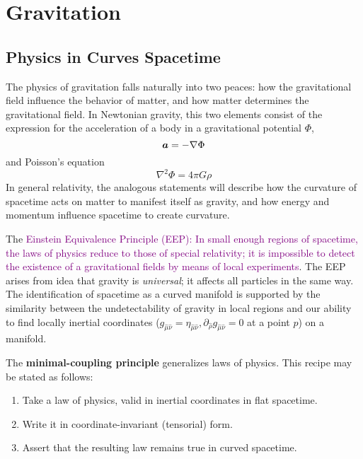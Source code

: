\section{Gravitation}\label{sec:4}
\subsection{Physics in Curves Spacetime}
The physics of gravitation falls naturally into two peaces: how the gravitational field influence the behavior of matter, and how matter determines the gravitational field. In Newtonian gravity, this two elements consist of the expression for the acceleration of a body in a gravitational potential $\Phi$,
\begin{equation}\label{4.1}
    \vb*{a}=-\nabla\Phi
\end{equation}
and Poisson's equation
\begin{equation*}
    \nabla^2\Phi=4\pi G\rho
\end{equation*}
In general relativity, the analogous statements will describe how the curvature of spacetime acts on matter to manifest itself as gravity, and how energy and momentum influence spacetime to create curvature.

The \textcolor{purple}{Einstein Equivalence Principle (EEP): In small enough regions of spacetime, the laws of physics reduce to those of special relativity; it is impossible to detect the existence of a gravitational fields by means of local experiments}. The EEP arises from idea that gravity is \textit{universal}; it affects all particles in the same way. The identification of spacetime as a curved manifold is supported by the similarity between the undetectability of gravity in local regions and our ability to find locally inertial coordinates ($g_{\hat{\mu}\hat{\nu}}=\eta_{\hat{\mu}\hat{\nu}}, \partial_{\hat{\rho}}g_{\hat{\mu}\hat{\nu}}=0$ at a point $p$) on a manifold.

The \textbf{minimal-coupling principle} generalizes laws of physics. This recipe may be stated as follows:
\begin{enumerate}
    \item Take a law of physics, valid in inertial coordinates in flat spacetime.
    \item Write it in coordinate-invariant (tensorial) form.
    \item Assert that the resulting law remains true in curved spacetime.
\end{enumerate}

